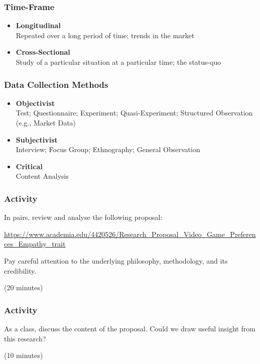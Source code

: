 \begin{frame}
	\frametitle{Time-Frame}
	\begin{itemize}
		\item \textbf{Longitudinal} \\
		Repeated over a long period of time; trends in the market
		\item \textbf{Cross-Sectional} \\
		Study of a particular situation at a particular time; the status-quo
	\end{itemize}
\end{frame}

\begin{frame}
	\frametitle{Data Collection Methods}
	
	\begin{itemize}
		\item \textbf{Objectivist} \\
		Test; Questionnaire; Experiment; Quasi-Experiment; Structured Observation (e.g., Market Data)
		\item \textbf{Subjectivist} \\
		Interview; Focus Group; Ethnography; General Observation
		\item \textbf{Critical} \\
		Content Analysis
	\end{itemize}
\end{frame}


\begin{frame}
	\frametitle{Activity}
	
	In pairs, review and analyse the following proposal:
	
	\vspace{1em}
	
	\url{https://www.academia.edu/4420526/Research_Proposal_Video_Game_Preferences_Empathy_trait}
	
	\vspace{1em}
	
	Pay careful attention to the underlying philosophy, methodology, and its credibility.
	
	\vspace{1em}
	
	(20 minutes)
	
\end{frame}

\begin{frame}
	\frametitle{Activity}
	
	As a class, discuss the content of the proposal. Could we draw useful insight from this research?
	
	\vspace{1em}
	
	(10 minutes)
	
\end{frame}

